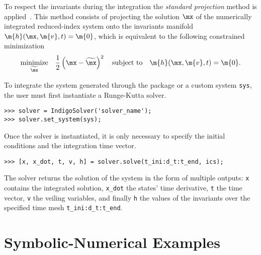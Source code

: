 To respect the invariants during the integration the \emph{standard projection} method is applied~\cite{hairer2000symmetric}. This method consists of projecting the solution $\mx$ of the numerically integrated reduced-index system onto the invariants manifold $\m{h}(\mx, \m{v}, t) = \m{0}$, which is equivalent to the following constrained minimization
%
\begin{equation}
  \underset{\widetilde{\mx}}{\textrm{minimize}} \quad \dfrac{1}{2}\left(\mx - \widetilde{\mx}\right)^2
    \quad \textrm{subject to} \quad
    \m{h}(\mx, \m{v}, t) = \m{0}.
\end{equation}

To integrate the system generated through the \Matlab{} package or a custom system \texttt{sys}, the user must first instantiate a \Indigo{} Runge-Kutta solver.
%
\begin{verbatim}
>>> solver = IndigoSolver('solver_name');
>>> solver.set_system(sys);
\end{verbatim}
%
Once the solver is instantiated, it is only necessary to specify the initial conditions and the integration time vector.
%
\begin{verbatim}
>>> [x, x_dot, t, v, h] = solver.solve(t_ini:d_t:t_end, ics);
\end{verbatim}
%
The solver returns the solution of the system in the form of multiple outputs: \texttt{x} contains the integrated solution, \texttt{x\_dot} the states' time derivative, \texttt{t} the time vector, \texttt{v} the veiling variables, and finally \texttt{h} the values of the invariants over the specified time mesh \texttt{t\_ini:d\_t:t\_end}.


\section{Symbolic-Numerical Examples}
\label{chap3:sec:examples}

